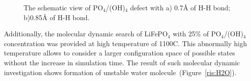 \begin{figure}[h!]
\begin{minipage}[h]{0.5\linewidth}
\end{minipage}
\hfill
\begin{minipage}[h]{0.5\linewidth}
\end{minipage}
\caption{The schematic view of PO$_4$/(OH)$_4$ defect with a) 0.7\AA \xspace of H-H bond; b)0.85\AA \xspace of H-H bond.}
\label{ris:HFE}
\end{figure}

\newpage
Additionally, the molecular dynamic search of LiFePO$_4$ with 25\% of PO$_4$/(OH)$_4$ concentration was provided at high temperature of 1100\textdegree C. This abnormally high temperature allows to consider a larger configuration space of possible states without the increase in simulation time. The result of such molecular dynamic investigation shows formation of unstable water molecule~(Figure~\ref{ris:H2O}). 

